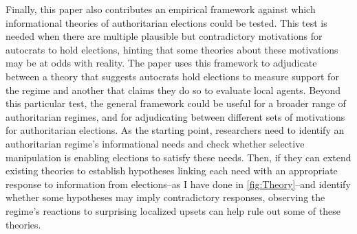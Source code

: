 \documentclass[12pt]{article}
\newcommand{\1}{\mathbbm{1}}
\begin{document}
Finally, this paper also contributes an empirical framework against which informational theories of authoritarian elections could be tested. This test is needed when there are multiple plausible but contradictory motivations for autocrats to hold elections, hinting that some theories about these motivations may be at odds with reality. The paper uses this framework to adjudicate between a theory that suggests autocrats hold elections to measure support for the regime and another that claims they do so to evaluate local agents. Beyond this particular test, the general framework could be useful for a broader range of authoritarian regimes, and for adjudicating between different sets of motivations for authoritarian elections. As the starting point, researchers need to identify an authoritarian regime's informational needs and check whether selective manipulation is enabling elections to satisfy these needs. Then, if they can extend existing theories to establish hypotheses linking each need with an appropriate response to information from elections--as I have done in \autoref{fig:Theory}--and identify whether some hypotheses may imply contradictory responses, observing the regime's reactions to surprising localized upsets can help rule out some of these theories. 

\end{document}
